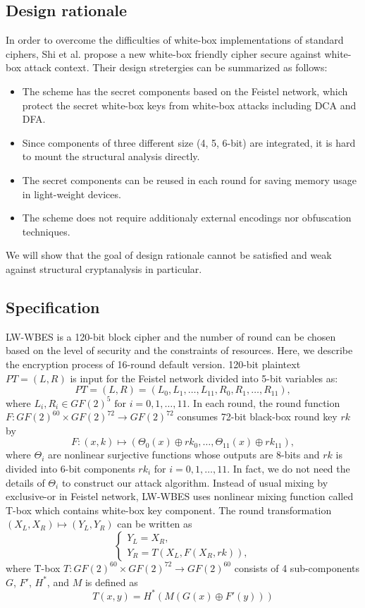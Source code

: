 \documentclass{ieeeaccess}
\begin{document}
\subsection{Design rationale}
In order to overcome the difficulties of white-box implementations
of standard ciphers, Shi et al. propose a new white-box friendly cipher secure 
against white-box attack context.
Their design stretergies can be summarized as follows:
\begin{itemize}
\item The scheme has the secret components
based on the Feistel network, which protect the secret white-box keys from
white-box attacks including DCA and DFA.
\item Since components of three different size (4, 5, 6-bit) are integrated,
it is hard to mount the structural analysis directly.
\item The secret components can be reused in each round for saving memory usage
in light-weight devices.
\item The scheme does not require additionaly external encodings
nor obfuscation techniques. 
\end{itemize}
We will show that the goal of design rationale cannot be satisfied
and weak against structural cryptanalysis in particular.

\subsection{Specification}

LW-WBES is a 120-bit block cipher and the number of round
can be chosen based on the level of security and the constraints of resources.
Here, we describe the encryption process of 16-round default version.
120-bit plaintext $PT=(L,R)$ is input  for the Feistel network divided into
5-bit variables as:
\[
PT = (L,R) = (L_0, L_1, \ldots, L_{11}, R_0, R_1, \ldots, R_{11}),
\]
where 
$L_i, R_i \in GF(2)^5 \text{ for } i=0,1, \ldots, 11$.
In each round, the round function $F: GF(2)^{60}\times GF(2)^{72} \to GF(2)^{72}$
consumes 72-bit black-box round key $rk$ by
\[
F: (x,k) \mapsto (\Theta_0(x)\oplus rk_0, \ldots, \Theta_{11}(x)\oplus rk_{11}),
\]
where $\Theta_i$ are nonlinear surjective functions whose outputs are 8-bits 
and $rk$ is divided into 6-bit components $rk_i$ for $i=0,1,\ldots, 11$.
In fact, we do not need the details of $\Theta_i$ to construct our attack algorithm.
Instead of usual mixing by exclusive-or in Feistel network,
LW-WBES uses nonlinear mixing function called T-box which contains
white-box key component.
The round transformation $(X_L, X_R) \mapsto (Y_L, Y_R)$ can be written as
\[
\begin{cases}
Y_L = X_R, \\
Y_R = T(X_L, F(X_R,rk)),
\end{cases}
\]
where T-box $T: GF(2)^{60} \times GF(2)^{72} \to GF(2)^{60}$  consists of
4 sub-components $G$, $F'$, $H^*$, and $M$ is defined as
\begin{equation}\label{eq-T-box}
T(x,y) = H^*(M(G(x)\oplus F'(y)))
\end{equation}
\end{document}
